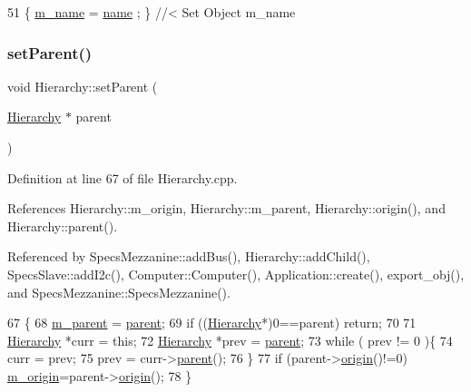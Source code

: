 \begin{DoxyCode}
51 \{ \hyperlink{classObject_a8b83c95c705d2c3ba0d081fe1710f48d}{m\_name}  = \hyperlink{classObject_a300f4c05dd468c7bb8b3c968868443c1}{name}  ; \} \textcolor{comment}{//< Set Object m\_name}
\end{DoxyCode}
\mbox{\label{classHierarchy_a585ad1aeec16077a0e532ab8b4fc557b}} 
\subsubsection{\texorpdfstring{set\+Parent()}{setParent()}}
{\footnotesize\ttfamily void Hierarchy\+::set\+Parent (\begin{DoxyParamCaption}\item[{\hyperlink{classHierarchy}{Hierarchy} $\ast$}]{parent }\end{DoxyParamCaption})\hspace{0.3cm}{\ttfamily [inherited]}}



Definition at line 67 of file Hierarchy.\+cpp.



References Hierarchy\+::m\+\_\+origin, Hierarchy\+::m\+\_\+parent, Hierarchy\+::origin(), and Hierarchy\+::parent().



Referenced by Specs\+Mezzanine\+::add\+Bus(), Hierarchy\+::add\+Child(), Specs\+Slave\+::add\+I2c(), Computer\+::\+Computer(), Application\+::create(), export\+\_\+obj(), and Specs\+Mezzanine\+::\+Specs\+Mezzanine().


\begin{DoxyCode}
67                                               \{
68   \hyperlink{classHierarchy_a5814bb280d4e8539ab25ab6cbfb9cc4f}{m\_parent} = \hyperlink{classHierarchy_a1c7bec8257e717f9c1465e06ebf845fc}{parent};
69   \textcolor{keywordflow}{if} ((\hyperlink{classHierarchy}{Hierarchy}*)0==parent) \textcolor{keywordflow}{return};
70 
71   \hyperlink{classHierarchy}{Hierarchy} *curr = \textcolor{keyword}{this};
72   \hyperlink{classHierarchy}{Hierarchy} *prev = \hyperlink{classHierarchy_a1c7bec8257e717f9c1465e06ebf845fc}{parent};
73   \textcolor{keywordflow}{while} ( prev != 0 )\{
74     curr = prev;
75     prev = curr->\hyperlink{classHierarchy_a1c7bec8257e717f9c1465e06ebf845fc}{parent}();
76   \}
77   \textcolor{keywordflow}{if} (parent->\hyperlink{classHierarchy_aee461dc930ce3871636ff87f075b1b83}{origin}()!=0) \hyperlink{classHierarchy_a16c73e557d3a7c156ffb5dc4102d148e}{m\_origin}=parent->\hyperlink{classHierarchy_aee461dc930ce3871636ff87f075b1b83}{origin}();
78 \}
\end{DoxyCode}
\mbox{\label{classFePGA_a2cd235d1971625d6742d4f3107489a07}} 
